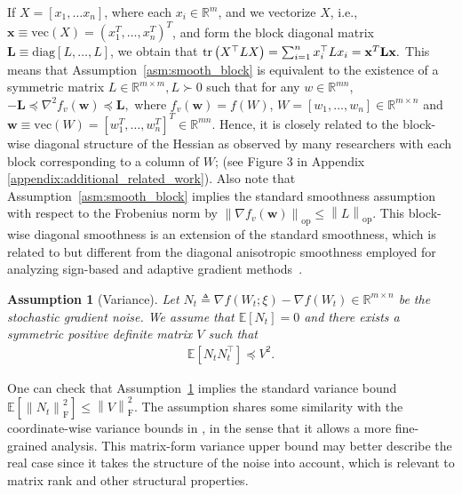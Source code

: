 \documentclass{article}
\newtheorem{assumption}{Assumption}
\theoremstyle{remark}
\newcommand{\Norm}[1]{\left\|#1\right\|}
\newcommand{\tr}[1]{{\rm tr}\left( #1 \right)}
\newcommand{\bw}{\mathbf{w}}
\newcommand{\EE}{\mathbb{E}}
\newcommand{\RR}{\mathbb{R}}
\begin{document}
If $X = [x_1,\dots x_n]$, where each $x_i \in \RR^{m}$, and we vectorize $X$, i.e., $\mathbf{x} \equiv \mathrm{vec}(X) = (x_1^T, \ldots,x_n^T)^T$, and form the block diagonal matrix $\mathbf{L \equiv }\mathrm{diag}[L,\dots,L]$, we obtain that
$
    \tr{X^\top L X} = \sum_{i=1}^n x_i^\top L x_i = \mathbf{x}^T \mathbf{L} \mathbf{x}.
$
This means that Assumption~\ref{asm:smooth_block} is equivalent to the existence of a symmetric matrix $L \in \RR^{m\times m}, L\succ 0$ such that for any $w \in \RR^{mn}$,
$
-\mathbf{L}\preceq \nabla^2f_v(\mathbf{w}) \preceq
\mathbf{L},
$
where $f_v(\mathbf{w}) = f(W)$, $W = [w_1,\dots,w_n] \in \RR^{m\times n}$ and $\mathbf{w} \equiv \mathrm{vec}(W) = [w_1^T,\dots,w_n^T]^T \in \RR^{mn}$. Hence, it is closely related to the block-wise diagonal structure of the Hessian as observed by many researchers with each block corresponding to a column of $W$;
(see Figure 3 in Appendix \ref{appendix:additional_related_work}). Also note that Assumption~\ref{asm:smooth_block} implies the standard smoothness assumption with respect to the Frobenius norm by $\Norm{\nabla f_v(\bw)}_{\mathrm{op}} \le \Norm{L}_{\mathrm{op}}$. This block-wise diagonal smoothness is an extension of the standard smoothness, which is related to but different from the diagonal anisotropic smoothness employed for analyzing sign-based and adaptive gradient methods~\citep{bernstein2018signsgd,liu2024adagrad}.
\begin{assumption}[Variance]\label{asm:variance_matrix}
    Let $N_t \triangleq \nabla f(W_t;\xi) - \nabla f(W_t) \in \RR^{m\times n}$ be the stochastic gradient noise. We assume that $\EE[N_t] = 0$ and there exists a symmetric positive definite matrix $V$ such that
    \begin{align*}
        \EE\left[ N_t N_t^\top \right] \preceq V^2 .
    \end{align*}
\end{assumption}
One can check that Assumption~\ref{asm:variance_matrix} implies the standard variance bound $\EE[\Norm{N_t}_{\mathrm{F}}^2] \le \Norm{V}_{\mathrm{F}}^2$. The assumption shares some similarity with the coordinate-wise variance bounds in \citet{bernstein2018signsgd,crawshaw2022robustness,liu2024adagrad}, in the sense that it allows a more fine-grained analysis. This matrix-form variance upper bound may better describe the real case since it takes the structure of the noise into account, which is relevant to matrix rank and other 
structural
properties.
\end{document}
